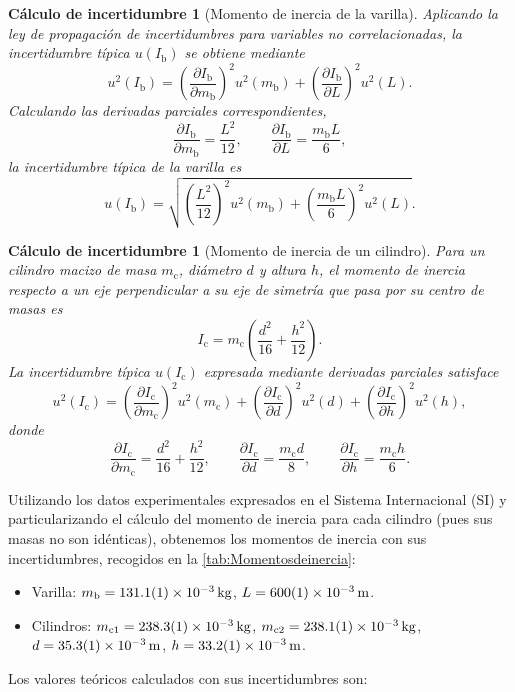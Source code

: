 \documentclass[a4paper,11pt]{amsart}
\numberwithin{equation}{section}
\newcommand{\Ib}{I_{\mathrm{b}}}              %
\newcommand{\Ic}{I_{\mathrm{c}}}              %
\newcommand{\mb}{m_{\mathrm{b}}}
\newcommand{\mc}{m_{\mathrm{c}}}
\theoremstyle{cienplano}
\theoremstyle{ciendef}
\newtheorem{calculo}[proposicion]{Cálculo de incertidumbre}
\theoremstyle{cienobs}
\begin{document}
\begin{calculo}[Momento de inercia de la varilla]\label{calc:Ib}
Aplicando la ley de propagación de incertidumbres para variables no
correlacionadas, la incertidumbre típica $u(\Ib)$ se obtiene mediante
\begin{equation}\label{eq:uIb}
  u^{2}(\Ib)=\left(\frac{\partial\Ib}{\partial\mb}\right)^{\!2}u^{2}(\mb)
            +\left(\frac{\partial\Ib}{\partial L}\right)^{\!2}u^{2}(L).
\end{equation}
Calculando las derivadas parciales correspondientes,
\begin{equation}\label{eq:dIb}
  \frac{\partial\Ib}{\partial\mb}=\frac{L^{2}}{12},
  \qquad
  \frac{\partial\Ib}{\partial L}=\frac{\mb L}{6},
\end{equation}
la incertidumbre típica de la varilla es
\begin{equation}\label{eq:uIb2}
  u(\Ib)=\sqrt{\left(\frac{L^{2}}{12}\right)^{\!2}u^{2}(\mb)
              +\left(\frac{\mb L}{6}\right)^{\!2}u^{2}(L)}.
\end{equation}
\end{calculo}

\begin{calculo}[Momento de inercia de un cilindro]\label{calc:Ic}
Para un cilindro macizo de masa $\mc$, diámetro $d$ y altura $h$, el momento
de inercia respecto a un eje perpendicular a su eje de simetría que pasa por
su centro de masas es
\begin{equation}\label{eq:Ic}
  \Ic=\mc\left(\frac{d^{2}}{16}+\frac{h^{2}}{12}\right).
\end{equation}
La incertidumbre típica $u(\Ic)$ expresada mediante derivadas parciales
satisface
\begin{equation}\label{eq:uIc}
  u^{2}(\Ic)=\left(\frac{\partial\Ic}{\partial\mc}\right)^{\!2}u^{2}(\mc)
            +\left(\frac{\partial\Ic}{\partial d}\right)^{\!2}u^{2}(d)
            +\left(\frac{\partial\Ic}{\partial h}\right)^{\!2}u^{2}(h),
\end{equation}
donde
\begin{equation}\label{eq:dIc}
  \frac{\partial\Ic}{\partial\mc}=\frac{d^{2}}{16}+\frac{h^{2}}{12},
  \qquad
  \frac{\partial\Ic}{\partial d}=\frac{\mc d}{8},
  \qquad
  \frac{\partial\Ic}{\partial h}=\frac{\mc h}{6}.
\end{equation}
\end{calculo}

Utilizando los datos experimentales expresados en el Sistema Internacional
(SI) y particularizando el cálculo del momento de inercia para cada cilindro
(pues sus masas no son idénticas), obtenemos los momentos de inercia con sus
incertidumbres, recogidos en la \cref{tab:Momentosdeinercia}:
\begin{itemize}
  \item Varilla: $\mb=\SI{131,1 \pm 0,1 e-3}{\kilogram}$,
        $L=\SI{600 \pm 1 e-3}{\meter}$.
  \item Cilindros: $m_{\mathrm{c}1}=\SI{238,3 \pm 0,1 e-3}{\kilogram}$,
        $m_{\mathrm{c}2}=\SI{238,1 \pm 0,1 e-3}{\kilogram}$,
        $d=\SI{35,3 \pm 0,1 e-3}{\meter}$,
        $h=\SI{33,2 \pm 0,1 e-3}{\meter}$.
\end{itemize}
Los valores teóricos calculados con sus incertidumbres son:
\end{document}
